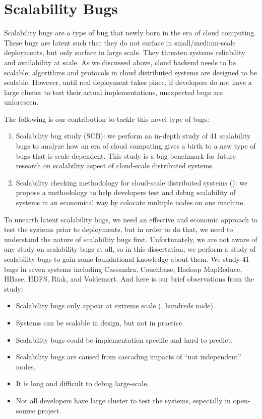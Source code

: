 \section{Scalability Bugs}

Scalability bugs are a type of bug that newly born in the era of cloud
computing. These bugs are latent such that they do not surface in
small/medium-scale deployments, but only surface in large scale. They threaten
systems reliability and availability at scale. As we discussed above, cloud
backend needs to be scalable; algorithms and protocols in cloud distributed
systems are designed to be scalable. However, until real deployment takes place,
if developers do not have a large cluster to test their actual implementations,
unexpected bugs are unforeseen. 

The following is our contribution to tackle this novel type of bugs:

\begin{enumerate}

\item Scalability bug study (SCB): we perform an in-depth study of 41
scalability bugs to analyze how an era of cloud computing gives a birth to a new
type of bugs that is scale dependent. This study is a bug benchmark for future
research on scalability aspect of cloud-scale distributed systems.

\item Scalability checking methodology for cloud-scale distributed systems
(\sck): we propose a methodology to help developers test and debug scalability
of systems in an economical way by colocate multiple nodes on one machine.

\end{enumerate}
\fi

To unearth latent scalability bugs, we need an effective and economic approach
to test the systems prior to deployments, but in order to do that, we need to
understand the nature of scalability bugs first. Unfortunately, we are not aware
of any study on scalability bugs at all, so in this dissertation, we perform a
study of scalability bugs to gain some foundational knowledge about them. We
study 41 bugs in seven systems including Cassandra, Couchbase, Hadoop MapReduce,
HBase, HDFS, Riak, and Voldemort. And here is our brief observations from the
study:

\begin{itemize}
\item Scalability bugs only appear at extreme scale (\eg, hundreds node).
\item Systems can be scalable in design, but not in practice.
\item Scalability bugs could be implementation specific and hard to predict.
\item Scalability bugs are caused from cascading impacts of ``not independent'' nodes.
\item It is long and difficult to debug large-scale.
\item Not all developers have large cluster to test the systems, especially in
open-source project.
\end{itemize}

